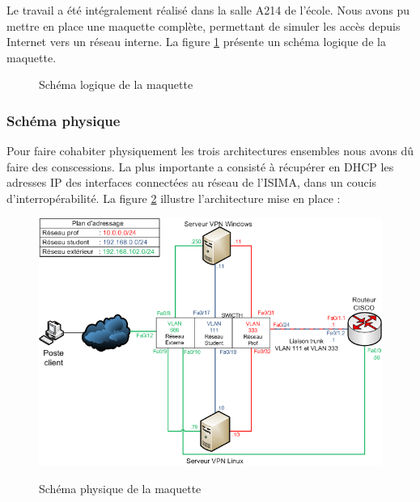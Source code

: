 Le travail a été intégralement réalisé dans la salle A214 de l'école. Nous avons pu mettre en place une maquette complète, permettant de simuler les accès depuis Internet vers un réseau interne. La figure \ref{schema-logique-maquette} présente un schéma logique de la maquette.

\begin{figure}[H]
	\begin{center}
	\end{center}
	\caption{Schéma logique de la maquette}
	\label{schema-logique-maquette}
\end{figure}

\subsubsection{Schéma physique}

Pour faire cohabiter physiquement les trois architectures ensembles nous avons dû faire des conscessions. La plus importante a consisté à récupérer en DHCP les adresses IP des interfaces connectées au réseau de l'ISIMA, dans un coucis d'interropérabilité. La figure \ref{schema-physique-maquette} illustre l'architecture mise en place :

\begin{figure}[H]
	\begin{center}
	\includegraphics[width=\textwidth]{partie_1/images/archi_phy.png}\\
	\end{center}
	\caption{Schéma physique de la maquette}
	\label{schema-physique-maquette}
\end{figure}

